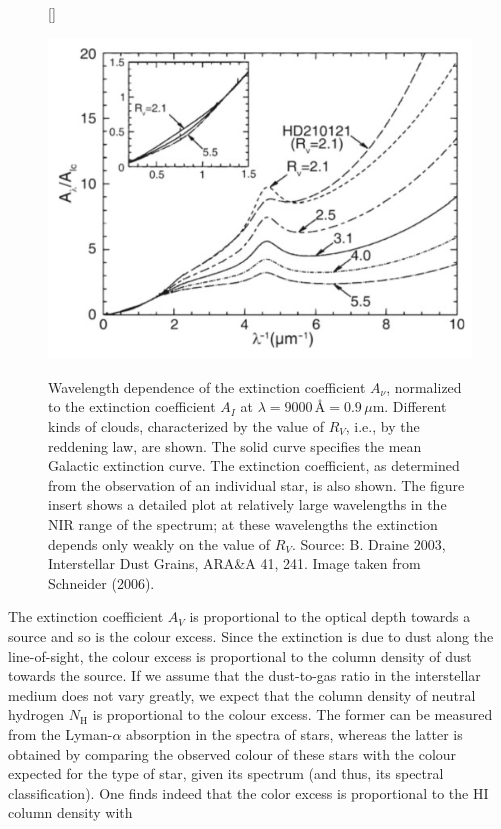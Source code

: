 \documentclass[a4paper,11pt]{article}
\begin{document}
\begin{figure}[h]
    [\FBwidth]
    {\caption{\footnotesize{Wavelength dependence of the extinction coefficient $A_\nu$, normalized to the extinction coefficient $A_I$ at $\lambda=9000$\,\AA$ = 0.9\,\mu$m. Different kinds of clouds, characterized by the value of $R_V$, i.e., by the reddening law, are shown. The solid curve specifies the mean Galactic extinction curve. The extinction coefficient, as determined from the observation of an individual star, is also shown. The figure insert shows a detailed plot at relatively large wavelengths in the NIR range of the spectrum; at these wavelengths the extinction depends only weakly on the value of $R_V$. Source: B. Draine 2003, Interstellar Dust Grains, ARA\&A 41, 241. Image taken from Schneider (2006).}}
    \label{fig:extinctioncurve}}
    {\includegraphics[width=12cm]{figures/ExtinctionCurve.png}}
\end{figure}

{\noindent}The extinction coefficient $A_V$ is proportional to the optical depth towards a source and so is the colour excess. Since the extinction is due to dust along the line-of-sight, the colour excess is proportional to the column density of dust towards the source. If we assume that the dust-to-gas ratio in the interstellar medium does not vary greatly, we expect that the column density of neutral hydrogen $N_\mathrm{H}$ is proportional to the colour excess. The former can be measured from the Lyman-$\alpha$ absorption in the spectra of stars, whereas the latter is obtained by comparing the observed colour of these stars with the colour expected for the type of star, given its spectrum (and thus, its spectral classification). One finds indeed that the color excess is proportional to the HI column density with
\end{document}
